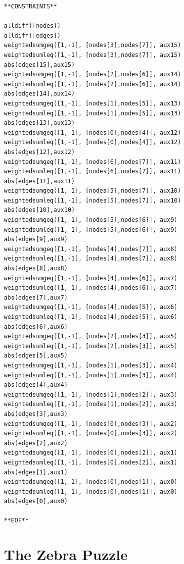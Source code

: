 \documentclass[oneside]{book}
\begin{document}
\begin{verbatim}
**CONSTRAINTS**

alldiff([nodes])
alldiff([edges])
weightedsumgeq([1,-1], [nodes[3],nodes[7]], aux15)
weightedsumleq([1,-1], [nodes[3],nodes[7]], aux15)
abs(edges[15],aux15)
weightedsumgeq([1,-1], [nodes[2],nodes[6]], aux14)
weightedsumleq([1,-1], [nodes[2],nodes[6]], aux14)
abs(edges[14],aux14)
weightedsumgeq([1,-1], [nodes[1],nodes[5]], aux13)
weightedsumleq([1,-1], [nodes[1],nodes[5]], aux13)
abs(edges[13],aux13)
weightedsumgeq([1,-1], [nodes[0],nodes[4]], aux12)
weightedsumleq([1,-1], [nodes[0],nodes[4]], aux12)
abs(edges[12],aux12)
weightedsumgeq([1,-1], [nodes[6],nodes[7]], aux11)
weightedsumleq([1,-1], [nodes[6],nodes[7]], aux11)
abs(edges[11],aux11)
weightedsumgeq([1,-1], [nodes[5],nodes[7]], aux10)
weightedsumleq([1,-1], [nodes[5],nodes[7]], aux10)
abs(edges[10],aux10)
weightedsumgeq([1,-1], [nodes[5],nodes[6]], aux9)
weightedsumleq([1,-1], [nodes[5],nodes[6]], aux9)
abs(edges[9],aux9)
weightedsumgeq([1,-1], [nodes[4],nodes[7]], aux8)
weightedsumleq([1,-1], [nodes[4],nodes[7]], aux8)
abs(edges[8],aux8)
weightedsumgeq([1,-1], [nodes[4],nodes[6]], aux7)
weightedsumleq([1,-1], [nodes[4],nodes[6]], aux7)
abs(edges[7],aux7)
weightedsumgeq([1,-1], [nodes[4],nodes[5]], aux6)
weightedsumleq([1,-1], [nodes[4],nodes[5]], aux6)
abs(edges[6],aux6)
weightedsumgeq([1,-1], [nodes[2],nodes[3]], aux5)
weightedsumleq([1,-1], [nodes[2],nodes[3]], aux5)
abs(edges[5],aux5)
weightedsumgeq([1,-1], [nodes[1],nodes[3]], aux4)
weightedsumleq([1,-1], [nodes[1],nodes[3]], aux4)
abs(edges[4],aux4)
weightedsumgeq([1,-1], [nodes[1],nodes[2]], aux3)
weightedsumleq([1,-1], [nodes[1],nodes[2]], aux3)
abs(edges[3],aux3)
weightedsumgeq([1,-1], [nodes[0],nodes[3]], aux2)
weightedsumleq([1,-1], [nodes[0],nodes[3]], aux2)
abs(edges[2],aux2)
weightedsumgeq([1,-1], [nodes[0],nodes[2]], aux1)
weightedsumleq([1,-1], [nodes[0],nodes[2]], aux1)
abs(edges[1],aux1)
weightedsumgeq([1,-1], [nodes[0],nodes[1]], aux0)
weightedsumleq([1,-1], [nodes[0],nodes[1]], aux0)
abs(edges[0],aux0)

**EOF**
\end{verbatim}

\section{The Zebra Puzzle} 
\end{document}
